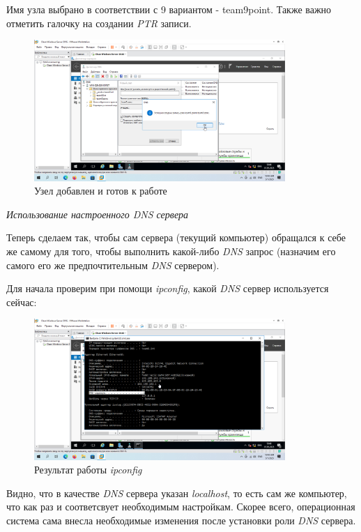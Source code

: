 \documentclass[a4paper]{article}
\begin{document}
  Имя узла выбрано в соответствии с 9 вариантом - team9\textunderscore point.
  Также важно отметить галочку на создании \textit{PTR} записи.

  \begin{figure}[H]
    \centering
    \includegraphics[width=0.85\textwidth]{9_0087}
    \caption{Узел добавлен и готов к работе}
    \label{img:0087}
  \end{figure}

  \textit{Использование настроенного \textit{DNS} сервера}

   Теперь сделаем так, чтобы сам сервера (текущий компьютер) обращался
   к себе же самому для того, чтобы выполнить какой-либо \textit{DNS} запрос
   (назначим его самого его же предпочтительным \textit{DNS} сервером).

   Для начала проверим при помощи \textit{ipconfig}, какой \textit{DNS}
   сервер используется сейчас:

  \begin{figure}[H]
    \centering
    \includegraphics[width=0.85\textwidth]{9_0089}
    \caption{Результат работы \textit{ipconfig}}
    \label{img:0089}
  \end{figure}

  Видно, что в качестве \textit{DNS} сервера указан \textit{localhost},
  то есть сам же компьютер, что как раз и соответсвует необходимым настройкам.
  Скорее всего, операционная система сама внесла необходимые изменения
  после установки роли \textit{DNS} сервера.
\end{document}
